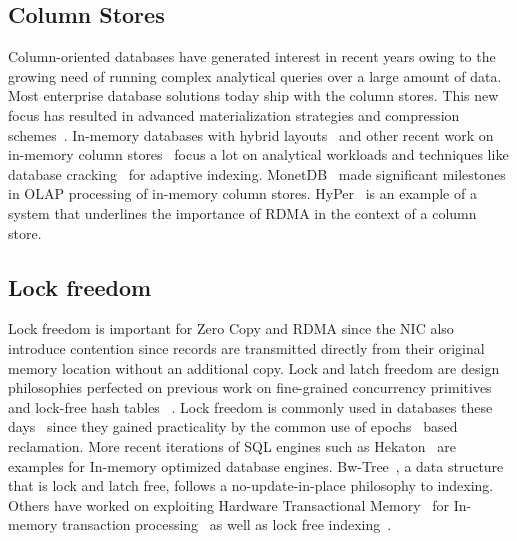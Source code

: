 \subsection{Column Stores}
Column-oriented databases have generated interest in recent years owing to the growing 
need of running complex analytical queries over a large amount of data. Most enterprise 
database solutions today ship with the column stores. This new focus has resulted 
in advanced materialization strategies and compression schemes~\cite{cstore,cstorevsrowstore,cstore-material,cstorecompression}.
In-memory databases with hybrid layouts~\cite{hybridinmemorycolstore} and other recent work on in-memory column stores~\cite{inmemorycracking} 
focus a lot on analytical workloads and techniques like database cracking~\cite{databasecracking} for adaptive indexing. 
MonetDB~\cite{monetdb} made significant milestones in OLAP processing of in-memory column stores. HyPer~\cite{hyperhybrid} 
is an example of a system that underlines the importance of RDMA in the context of a column store.


\subsection{Lock freedom}
Lock freedom is important for Zero Copy and RDMA since the NIC also introduce contention 
since records are transmitted directly from their original memory location without an 
additional copy. Lock and latch freedom are 
design philosophies perfected on previous work on fine-grained concurrency 
primitives~\cite{finegrained} and lock-free hash tables ~\cite{lockfreeht}. Lock freedom is commonly
used in databases these days~\cite{htm} since they gained practicality by the common use of
epochs~\cite{lockfreedom} based reclamation. 
More recent iterations of SQL engines such as Hekaton~\cite{hekaton} are 
examples for In-memory optimized  database engines. Bw-Tree~\cite{bw-tree}, a 
data structure that is lock and latch free, follows a no-update-in-place philosophy to indexing.
Others have worked on exploiting Hardware Transactional Memory~\cite{htm-old}
for In-memory transaction processing~\cite{drtm} as well as lock free indexing~\cite{htm}.

